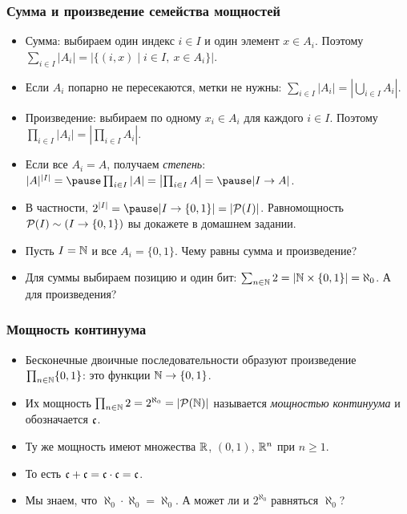 \documentclass[10pt]{beamer}
\begin{document}
\begin{frame}
    \frametitle{Сумма и произведение семейства мощностей}
    \begin{itemize}
        \item Сумма: выбираем один индекс $i\in I$ и один элемент $x\in A_i$. Поэтому $\sum_{i\in I}|A_i|=|\{(i,x)\mid i\in I,\ x\in A_i\}|$.
        \item Если $A_i$ попарно не пересекаются, метки не нужны: $\sum_{i\in I}|A_i|=\left|\bigcup_{i\in I}A_i\right|$.
        \pause
        \item Произведение: выбираем по одному $x_i\in A_i$ для каждого $i\in I$. Поэтому $\prod_{i\in I}|A_i|=\left|\prod_{i\in I}A_i\right|$.
        \pause
        \item Если все $A_i=A$, получаем \emph{степень}:
        $|A|^{|I|}=\pause \prod_{i\in I}|A|=\left|\prod_{i\in I}A\right|=\pause |I\to A|$.
        \item В частности, $2^{|I|}=\pause |I\to\{0,1\}|=|\pow{I}|$. Равномощность $\mathcal{P}({I})\sim(I\to\{0,1\})$ вы докажете в домашнем задании.
        \pause
        \item Пусть $I=\mathbb{N}$ и все $A_i=\{0,1\}$. Чему равны сумма и произведение?
        \pause
        \item Для суммы выбираем позицию и один бит: $\sum_{n\in\mathbb{N}}2=|\mathbb{N}\times\{0,1\}|=\aleph_0$. А для произведения?
    \end{itemize}
\end{frame}

\begin{frame}
    \frametitle{Мощность континуума}
    \begin{itemize}
        \item Бесконечные двоичные последовательности образуют произведение $\prod_{n\in\mathbb{N}}\{0,1\}$: это функции $\mathbb{N}\to\{0,1\}$.
        \item Их мощность $\prod_{n\in\mathbb{N}}2=2^{\aleph_0}=|\mathcal{P}({\mathbb{N}})|$ называется \emph{мощностью континуума} и обозначается $\mathfrak{c}$.
        \item Ту же мощность имеют множества $\mathbb{R}$, $(0, 1)$, $\mathbb{R}^n$ при $n\geq1$.
        \item То есть $\mathfrak{c} + \mathfrak{c} = \mathfrak{c} \cdot \mathfrak{c} = \mathfrak{c}$.
        \pause
        \item Мы знаем, что $\aleph_0\cdot\aleph_0=\aleph_0$. А может ли и $2^{\aleph_0}$ равняться $\aleph_0$?
    \end{itemize}
\end{frame}
\end{document}

